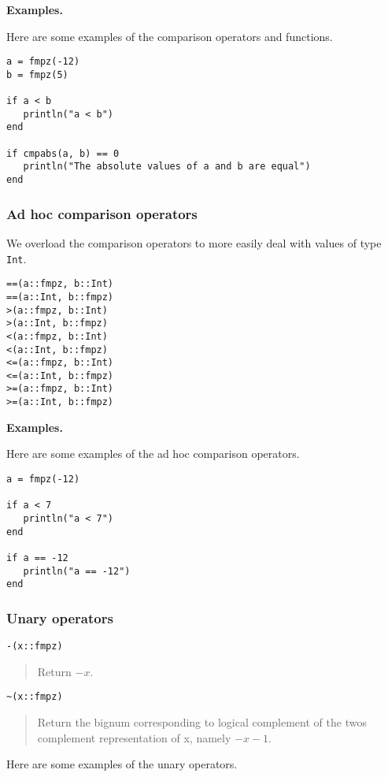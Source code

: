 \documentclass[a4paper,10pt]{article}
\newcommand{\code}{\lstinline}
\newcommand{\desc}[1]{\vspace{-3mm}\begin{quote}#1\end{quote}}
\begin{document}
{{\textbf{Examples.}

Here are some examples of the comparison operators and functions.

\begin{lstlisting}
a = fmpz(-12)
b = fmpz(5)

if a < b
   println("a < b")
end

if cmpabs(a, b) == 0
   println("The absolute values of a and b are equal")
end
\end{lstlisting}

\subsubsection{Ad hoc comparison operators}

We overload the comparison operators to more easily deal with values of type \code{Int}.

\begin{lstlisting}
==(a::fmpz, b::Int)
==(a::Int, b::fmpz)
>(a::fmpz, b::Int)
>(a::Int, b::fmpz)
<(a::fmpz, b::Int)
<(a::Int, b::fmpz)
<=(a::fmpz, b::Int)
<=(a::Int, b::fmpz)
>=(a::fmpz, b::Int)
>=(a::Int, b::fmpz)
\end{lstlisting}

\textbf{Examples.}

Here are some examples of the ad hoc comparison operators.

\begin{lstlisting}
a = fmpz(-12)

if a < 7
   println("a < 7")
end

if a == -12
   println("a == -12")
end
\end{lstlisting}

\subsubsection{Unary operators}

\begin{lstlisting}
-(x::fmpz)
\end{lstlisting}

\desc{Return $-x$.}

\begin{lstlisting}
~(x::fmpz)
\end{lstlisting}

\desc{Return the bignum corresponding to logical complement of the twos 
complement representation of x, namely $-x - 1$.}

Here are some examples of the unary operators.

}}
\end{document}
